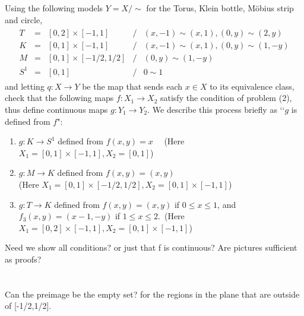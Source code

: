 \documentclass{jhwhw}
\begin{document}
\problem{}%
\noindent
Using the following models $Y = X/\sim$ for the Torus, Klein bottle, M\"obius strip and circle,	
\begin{eqnarray*}
	\begin{array}{ccccl}
		T & = & [0,2]\times [-1,1] & / & (x,-1)\sim (x,1), (0,y)\sim (2,y)\\
		K & = & [0,1]\times [-1,1]  & / & (x,-1) \sim (x,1), (0,y)\sim (1,-y)\\
		M & = & [0,1]\times [-1/2,1/2] & / & (0,y)\sim (1,-y)\\
		S^1 & = & [0,1] & / & 0\sim 1
	\end{array}
\end{eqnarray*}
and letting $q:X\to Y$ be the map that sends each $x\in X$ to its equivalence class,
check that the following maps $f:X_1\to X_2$ satisfy the condition of problem (2), thus define continuous maps $g:Y_1\to Y_2$.  We describe this process briefly  as  \lq\lq $g$ is defined from $f$":
\begin{enumerate}
	
	\item $g: K \to S^1$ defined from $ f(x,y) = x$ \ \ (Here $X_1= [0,1]\times [-1,1] , X_2 = [0,1]$)
	\item $g: M \to K$ defined from $f (x,y) = (x,y)$ \\ (Here $X_1= [0,1]\times [-1/2,1/2] ,X_2 = [0,1]\times [-1,1]$)
	\item $g:T\to K$ defined from $f(x,y) = (x,y)$ if $0\le x\le 1$, and $f_3(x,y) = (x-1,-y)$ if $1\le x\le 2$.\  (Here $X_1 = [0,2]\times [-1,1], X_2 = [0,1]\times [-1,1] $)
\end{enumerate}
\solution{}
\noindent
Need we show all conditions? or just that f is continuous?
Are pictures sufficient as proofs?

\part{}%
\noindent


\part{}%
\noindent
Can the preimage be the empty set? for the regions in the plane that are outside of [-1/2,1/2].

\part{}%
\noindent
\end{document}

